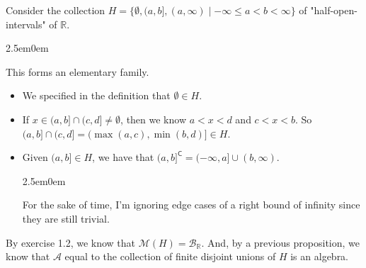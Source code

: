 \documentclass{book}
\newcommand{\hOne}{%
   \color{Black}%
   \fontsize{14}{16}\selectfont%
}
\newcommand{\hTwo}{%
\color{MidnightBlue}%
   \fontsize{13}{15}\selectfont%
}
\newcommand{\myComment}{%
   \color{RawerSienna}%
   \fontsize{12}{14}\selectfont%
}
\newenvironment{myIndent}{%
   \begin{adjustwidth}{2.5em}{0em}%
}{%
   \end{adjustwidth}%
}
\newcommand{\comp}{\mathsf{C}}
\newcommand{\retTwo}{\hfill\bigbreak}
\begin{document}
\hOne Consider the collection $H = \{\emptyset, (a, b], (a, \infty) \mid -\infty \leq a < b < \infty\}$ of "half-open-intervals" of $\mathbb{R}$.

\begin{myIndent}\hTwo
   This forms an elementary family.
   \begin{itemize}
      \item We specified in the definition that $\emptyset \in H$.
      \item If $x \in (a, b] \cap (c, d] \neq \emptyset$, then we know $a < x < d$ and $c < x< b$. So\\ $(a, b] \cap (c, d] = (\max(a, c), \min(b, d)] \in H$.
      \item Given $(a, b] \in H$, we have that $(a , b]^\comp = (-\infty, a] \cup (b, \infty)$.
      \begin{myIndent}\myComment
         For the sake of time, I'm ignoring edge cases of a right bound of infinity since they are still trivial.\retTwo
      \end{myIndent}
   \end{itemize}
\end{myIndent}

By exercise 1.2, we know that $\mathcal{M}(H) = \mathcal{B}_{\mathbb{R}}$. And, by a previous proposition, we know that $\mathcal{A}$ equal to the collection of finite disjoint unions of $H$ is an algebra.\retTwo
\end{document}
